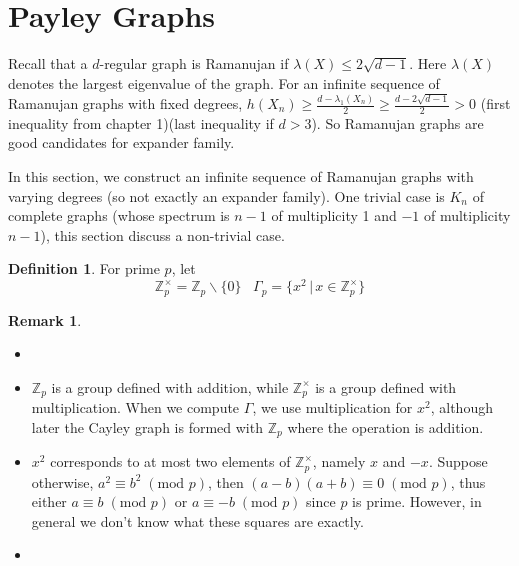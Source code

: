 \documentclass{book}
\newcommand{\Z}{\mathbb{Z}}
\newcommand{\Mod}[1]{\;(\textrm{mod } #1 )}
\theoremstyle{definition}
\newtheorem{definition}[lemma]{Definition}
\theoremstyle{remarkstyle}
\newtheorem*{remark}{Remark}%
\begin{document}
\section{Payley Graphs}
Recall that a $d$-regular graph is Ramanujan if $\lambda(X)\le2\sqrt{d-1}$. Here $\lambda(X)$ denotes the largest eigenvalue of the graph. For an infinite sequence of Ramanujan graphs with fixed degrees, $h(X_n)\ge \frac{d-\lambda_1(X_n)}{2} \ge\frac{d-2\sqrt{d-1}}{2} > 0 $ (first inequality from chapter 1)(last inequality if $d>3$). So Ramanujan graphs are good candidates for expander family. \newline 

In this section, we construct an infinite sequence of Ramanujan graphs with varying degrees (so not exactly an expander family). One trivial case is $K_n$ of complete graphs (whose spectrum is $n-1$ of multiplicity 1 and $-1$ of multiplicity $n-1$), this section discuss a non-trivial case. \newline 

\begin{definition}
    For prime $p$, let
    $$
    \Z^\times_p = \Z_p \backslash \{0\} \;\;\; \Gamma_p=\{x^2\,\lvert\,x\in\Z^\times_p\}
    $$
\end{definition}
\begin{remark}
    \begin{itemize}
        \item[]
        \item $\Z_p$ is a group defined with addition, while $\Z^\times_p$ is a group defined with multiplication. When we compute $\Gamma$, we use multiplication for $x^2$, although later the Cayley graph is formed with $\Z_p$ where the operation is addition.
        \item $x^2$ corresponds to at most two elements of $\Z^\times_p$, namely $x$ and $-x$. Suppose otherwise, $a^2\equiv b^2 \Mod{p} $, then $(a-b)(a+b)\equiv 0\Mod{p}$, thus either $a\equiv b\Mod{p}$ or $a\equiv -b\Mod{p}$ since $p$ is prime. However, in general we don't know what these squares are exactly.
        \item[] 
    \end{itemize}
\end{remark}
\end{document}
